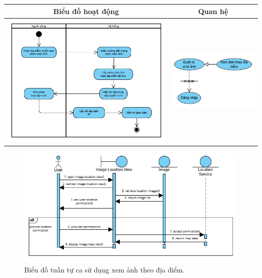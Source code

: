 \noindent 
\begin{tabular}{| c | c |}
    \hline
    \textbf{Biểu đồ hoạt động} & \textbf{Quan hệ} \\ 
    \hline
    \includegraphics[width=0.6\linewidth]{figures/c3/3-3-14-activity-diagram.png} 
    &  
    \includegraphics[width=0.35\linewidth]{figures/c3/3-3-14-relationship.png} \\ 
    \hline
\end{tabular}

\begin{figure}[H]
    \centering  
    \includegraphics[width=1\textwidth]{figures/c3/3-3-14-sequence-diagram.png}
    \caption{Biểu đồ tuần tự ca sử dụng xem ảnh theo địa điểm.}
    \label{fig:3-3-14-sequence-diagram}
\end{figure}